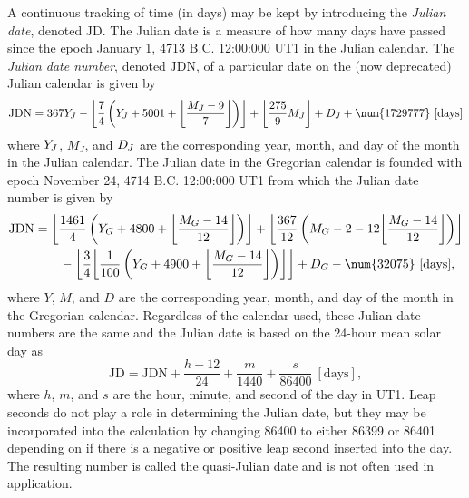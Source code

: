 \documentclass[11pt,dvipsnames]{thesis}
\DeclarePairedDelimiter{\floor}{\lfloor}{\rfloor}
\begin{document}
A continuous tracking of time (in days) may be kept by introducing the \textit{Julian date}, denoted $\mathrm{JD}$. The Julian date is a measure of how many days have passed since the epoch January 1, 4713 B.C. 12:00:000 UT1 in the Julian calendar. The \textit{Julian date number}, denoted $\mathrm{JDN}$, of a particular date on the (now deprecated) Julian calendar is given by
\begin{equation}
\mathrm{JDN} = 367 Y_{\hspace{-0.05em}J} - \floor*{\frac{7}{4}\left(Y_{\hspace{-0.05em}J} + 5001 + \floor*{\frac{M_J - 9}{7}}\right)} + \floor*{\frac{275}{9} M_J} + D_{\hspace{-0.05em}J} + \num{1729777} \ [\mathrm{days}]
\end{equation}
where $Y_{\hspace{-0.05em}J}$, $M_J$, and $D_{\hspace{-0.05em}J}$ are the corresponding year, month, and day of the month in the Julian calendar.
%
The Julian date in the Gregorian calendar is founded with epoch November 24, 4714 B.C. 12:00:000 UT1 from which the Julian date number is given by
\begin{align}
\mathrm{JDN} &= \floor*{\frac{1461}{4}\left(Y_G + 4800 + \floor*{\frac{M_G - 14}{12}}\right)} + \floor*{\frac{367}{12}\left(M_G - 2 - 12 \floor*{\frac{M_G - 14}{12}}\right)} \nonumber\\&\qquad - \floor*{\frac{3}{4}\floor*{\frac{1}{100}\left(Y_G + 4900 + \floor*{\frac{M_G - 14}{12}}\right)}} + D_G - \num{32075} \ [\mathrm{days}],
\end{align}
where $Y$, $M$, and $D$ are the corresponding year, month, and day of the month in the Gregorian calendar.
%
Regardless of the calendar used, these Julian date numbers are the same and the Julian date is based on the 24-hour mean solar day as
\begin{equation}
\mathrm{JD} = \mathrm{JDN} + \frac{h - 12}{24} + \frac{m}{\num{1440}} + \frac{s}{\num{86400}} \ [\mathrm{days}],
\end{equation}
where $h$, $m$, and $s$ are the hour, minute, and second of the day in UT1. Leap seconds do not play a role in determining the Julian date, but they may be incorporated into the calculation by changing 86400 to either 86399 or 86401 depending on if there is a negative or positive leap second inserted into the day. The resulting number is called the quasi-Julian date and is not often used in application.
\end{document}
